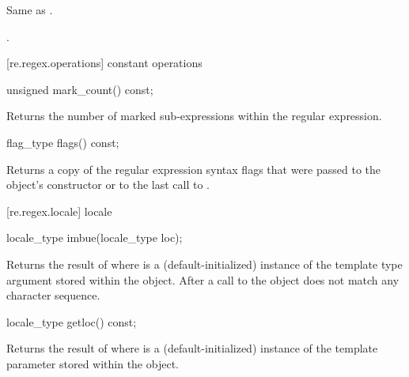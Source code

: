 \begin{itemdescr}
\pnum
\effects Same as .

\pnum
\returns {}.
\end{itemdescr}


[re.regex.operations]{ constant operations}

%
\begin{itemdecl}
unsigned mark_count() const; 
\end{itemdecl}

\begin{itemdescr}
\pnum
\effects  Returns the number of marked sub-expressions within the
regular expression.
\end{itemdescr}

%
\begin{itemdecl}
flag_type flags() const; 
\end{itemdecl}

\begin{itemdescr}
\pnum
\effects  Returns a copy of the regular expression syntax flags that
were passed to the object's constructor or to the last call
to .
\end{itemdescr}

[re.regex.locale]{ locale}%

%
\begin{itemdecl}
locale_type imbue(locale_type loc);
\end{itemdecl}

\begin{itemdescr}
\pnum\effects  Returns the result of  where
 is a (default-initialized) instance of the template
type argument  stored within the object.  After a call
to  the  object does not match any
character sequence.
\end{itemdescr}

%
\begin{itemdecl}
locale_type getloc() const; 
\end{itemdecl}

\begin{itemdescr}
\pnum\effects  Returns the result of  where
 is a (default-initialized) instance of the template
parameter  stored within the object.
\end{itemdescr}


